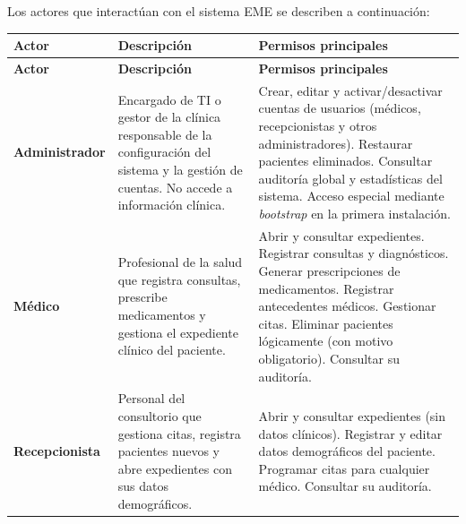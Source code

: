 \documentclass[11pt,a4paper]{article}
\begin{document}
Los actores que interactúan con el sistema EME se describen a continuación:

\begin{longtable}{|L{2.5cm}|L{5cm}|L{6cm}|}
    \hline
    \textbf{Actor}         & \textbf{Descripción}                                                                                                                         & \textbf{Permisos principales}                                                                                                                       \\
    \hline
    \endfirsthead

    \hline
    \textbf{Actor}         & \textbf{Descripción}                                                                                                                         & \textbf{Permisos principales}                                                                                                                       \\
    \hline
    \endhead

    \textbf{Administrador} & Encargado de TI o gestor de la clínica responsable de la configuración del sistema y la gestión de cuentas. No accede a información clínica. &
    Crear, editar y activar/desactivar cuentas de usuarios (médicos, recepcionistas y otros administradores). Restaurar pacientes eliminados. Consultar auditoría global y estadísticas del sistema. Acceso especial mediante \textit{bootstrap} en la primera instalación.                                                     \\
    \hline

    \textbf{Médico}        & Profesional de la salud que registra consultas, prescribe medicamentos y gestiona el expediente clínico del paciente.                        &
    Abrir y consultar expedientes. Registrar consultas y diagnósticos. Generar prescripciones de medicamentos. Registrar antecedentes médicos. Gestionar citas. Eliminar pacientes lógicamente (con motivo obligatorio). Consultar su auditoría.                                                                                \\
    \hline

    \textbf{Recepcionista} & Personal del consultorio que gestiona citas, registra pacientes nuevos y abre expedientes con sus datos demográficos.                        &
    Abrir y consultar expedientes (sin datos clínicos). Registrar y editar datos demográficos del paciente. Programar citas para cualquier médico. Consultar su auditoría.                                                                                                                                                      \\
    \hline


\end{longtable}
\end{document}
